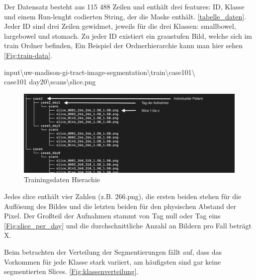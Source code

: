 Der Datensatz besteht aus 115 488 Zeilen und enthält drei features: ID, Klasse und einem Run-lenght codierten String, der die Maske enthält. \autoref{tabelle_daten}. Jeder ID sind drei Zeilen gewidmet, jeweils für die drei Klassen: small\textunderscore bowel, large\textunderscore bowel und stomach. Zu jeder ID existiert ein graustufen Bild, welche sich im train Ordner befinden, Ein Beispiel der Ordnerhierarchie kann man hier sehen \autoref{Fig:train-data}.

input\textbackslash uw-madison-gi-tract-image-segmentation\textbackslash train\textbackslash case101\textbackslash \\case101\textunderscore
day20\textbackslash scans\textbackslash slice.png

\begin{figure}[htb]
	\begin{center}
		\includegraphics[width=450pt]{bilder/data_tree}
		\caption{Trainingsdaten Hierachie}\label{Fig:train-data}
	\end{center}
\end{figure}

Jedes slice enthält vier Zahlen (z.B. 266.png), die ersten beiden stehen für die Auflösung des Bildes und die letzten beiden für den physischen Abstand der Pixel. Der Großteil der Aufnahmen stammt von Tag null oder Tag eins \autoref{Fig:slice_per_day} und die durchschnittliche Anzahl an Bildern pro Fall beträgt X.

Beim betrachten der Verteilung der Segmentierungen fällt auf, dass das Vorkommen für jede Klasse stark variiert, am häufigsten sind gar keine segmentierten Slices. \autoref{Fig:klassenverteilung}.

